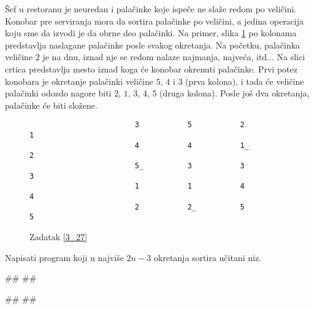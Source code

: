 \begin{Exercise}[difficulty=1, label=3_27]
  Šef u restoranu je neuredan i palačinke koje ispeče ne slaže redom
  po veličini. Konobar pre serviranja mora da sortira palačinke po
  veličini, a jedina operacija koju sme da izvodi je da obrne deo
  palačinki. Na primer, slika \ref{fig:palacinke} po kolonama predstavlja
  naslagane palačinke posle svakog okretanja. Na početku, palačinka
  veličine $2$ je na dnu, iznad nje se redom nalaze najmanja, najveća,
  itd... Na slici crtica predstavlja mesto iznad koga će konobar
  okrenuti palačinke. Prvi potez konobara je okretanje palačinki
  veličine $5$, $4$ i $3$ (prva kolona), i tada će veličine palačinki
  odozdo nagore biti $2$, $1$, $3$, $4$, $5$ (druga kolona). Posle još
  dva okretanja, palačinke će biti složene.
  \begin{figure}
\begin{verbatim}
                        3           5           2           1
                        4           4           1_          2
                        5_          3           3           3
                        1           1           4           4
                        2           2_          5           5
\end{verbatim}
\caption{Zadatak \ref{3_27}}
\label{fig:palacinke}
  \end{figure}
Napisati program koji u najviše $2n-3$ okretanja sortira učitani
niz. 
\begin{maxitest}
\begin{test}{1}
#\naslovUlaz#
##

#\naslovIzlaz#
##
\end{test}
\end{maxitest}

\end{Exercise}

